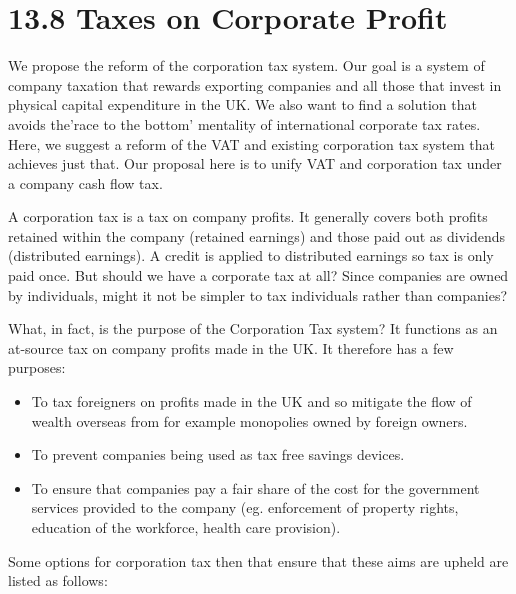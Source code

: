 \documentclass[]{tufte-handout}
\providecommand{\tightlist}{%
  \setlength{\itemsep}{0pt}\setlength{\parskip}{0pt}}
\begin{document}
\hypertarget{taxes-on-corporate-profit}{%
\section{13.8 Taxes on Corporate
Profit}\label{taxes-on-corporate-profit}}

We propose the reform of the corporation tax system. Our goal is a
system of company taxation that rewards exporting companies and all
those that invest in physical capital expenditure in the UK. We also
want to find a solution that avoids the'race to the bottom' mentality of
international corporate tax rates. Here, we suggest a reform of the VAT
and existing corporation tax system that achieves just that. Our
proposal here is to unify VAT and corporation tax under a company cash
flow tax.

A corporation tax is a tax on company profits. It generally covers both
profits retained within the company (retained earnings) and those paid
out as dividends (distributed earnings). A credit is applied to
distributed earnings so tax is only paid once. But should we have a
corporate tax at all? Since companies are owned by individuals, might it
not be simpler to tax individuals rather than companies?

What, in fact, is the purpose of the Corporation Tax system? It
functions as an at-source tax on company profits made in the UK. It
therefore has a few purposes:

\begin{itemize}
\tightlist
\item
  To tax foreigners on profits made in the UK and so mitigate the flow
  of wealth overseas from for example monopolies owned by foreign
  owners.
\item
  To prevent companies being used as tax free savings devices.
\item
  To ensure that companies pay a fair share of the cost for the
  government services provided to the company (eg. enforcement of
  property rights, education of the workforce, health care provision).
\end{itemize}

Some options for corporation tax then that ensure that these aims are
upheld are listed as follows:
\end{document}
